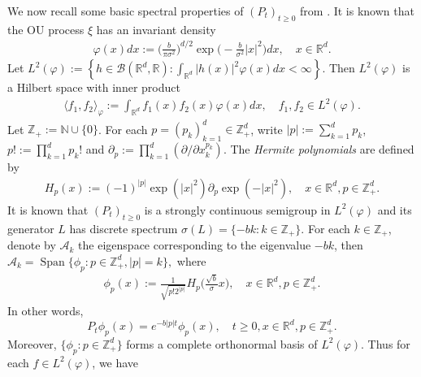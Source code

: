 \documentclass[12pt,a4paper]{amsart}
\theoremstyle{plain}
\theoremstyle{definition}
\numberwithin{equation}{section}
\begin{document}
We now recall some basic spectral properties of $(P_t)_{t\geq 0}$ from \cite{MetafunePallaraPriola2002Spectrum}.
It is known that the OU process $\xi$ has an invariant density
\begin{align}
\label{invariantdensity}
  \varphi(x)dx
  :=\Big (\frac{b}{\pi \sigma^2}\Big )^{d/2}\exp \Big(-\frac{b}{\sigma^2}|x|^2 \Big)dx,
  \quad x\in \mathbb R^d.
\end{align}
Let $L^2(\varphi):= \left\{ h  \in \mathcal B(\mathbb R^d, \mathbb R): \int_{\mathbb R^d} |h(x)|^2 \varphi(x) dx < \infty \right\}$.
Then $L^2(\varphi)$ is a Hilbert space with inner product
\begin{align}
  \langle f_1, f_2 \rangle_{\varphi}
  := \int_{\mathbb R^d}f_1(x)f_2(x)\varphi(x) dx, \quad f_1,f_2 \in L^2(\varphi).
\end{align}
Let $\mathbb Z_+ := \mathbb N\cup\{0\}$.
For each $p = (p_k)_{k = 1}^d \in \mathbb{Z}_+^{d}$, write $|p|:=\sum_{k=1}^d p_k$, $p!:= \prod_{k= 1}^d p_k!$ and $\partial_p:= \prod_{k = 1}^d(\partial/\partial x_k^{p_k})$.
The \emph{Hermite polynomials} are defined by
\begin{align}
  H_p(x)
  :=(-1)^{|p|}\exp(|x|^2) \partial_p \exp(-|x|^2) 
  , \quad x\in \mathbb R^d, p \in \mathbb{Z}_+^{d}.
\end{align}
It is known that $(P_t)_{t\geq 0}$ is a strongly continuous semigroup in $L^2(\varphi)$ and its generator $L$ has discrete spectrum $\sigma(L)= \{-bk: k \in \mathbb Z_+\}$.
For each $k \in \mathbb Z_+$, denote by $\mathcal{A}_k$ the eigenspace corresponding to the eigenvalue $-bk$, then
$
\mathcal{A}_k
= \operatorname{Span} \{\phi_p : p\in \mathbb Z_+^d, |p|=k\},
$
where
\begin{align}
  \label{eigenfunction}
  \phi_p(x)
  := \frac{1}{\sqrt{ p! 2^{|p|} }} H_p \Big(\frac{ \sqrt{b} }{\sigma}x \Big)
  , \quad x\in \mathbb R^d, p\in \mathbb Z_+^d.
\end{align}
In other words,
\begin{equation}
  P_t\phi_p(x)
  =e^{-b|p|t}\phi_p(x),
  \quad t\geq 0, x\in \mathbb R^d, p\in \mathbb Z_+^d.
\end{equation}
Moreover, $\{\phi_p: p \in \mathbb Z_+^d\}$ forms a complete orthonormal basis of $L^2(\varphi)$.
Thus for each $f\in L^2(\varphi)$, we have
\end{document}
